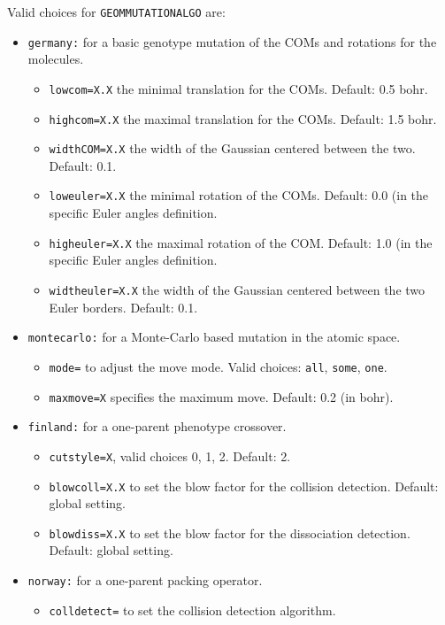 \documentclass[a4paper,10pt]{scrbook}
\begin{document}
Valid choices for \texttt{GEOMMUTATIONALGO} are:
\begin{itemize}
  \item \texttt{germany:} for a basic genotype mutation of the COMs and 
rotations for the molecules.
  \begin{itemize}
    \item \texttt{lowcom=X.X} the minimal translation for the COMs. Default: 
0.5 bohr.
    \item \texttt{highcom=X.X} the maximal translation for the COMs. Default: 
1.5 bohr.
    \item \texttt{widthCOM=X.X} the width of the Gaussian centered between the 
two. Default: 0.1.
    \item \texttt{loweuler=X.X} the minimal rotation of the COMs. Default: 0.0 
(in the specific Euler angles definition.
    \item \texttt{higheuler=X.X} the maximal rotation of the COM. Default: 1.0 
(in the specific Euler angles definition.
    \item \texttt{widtheuler=X.X} the width of the Gaussian centered between 
the two Euler borders. Default: 0.1.
  \end{itemize}
  \item \texttt{montecarlo:} for a Monte-Carlo based mutation in the atomic 
space.
  \begin{itemize}
    \item \texttt{mode=} to adjust the move mode. Valid choices: \texttt{all}, 
\texttt{some}, \texttt{one}.
    \item \texttt{maxmove=X} specifies the maximum move. Default: 0.2 (in bohr).
  \end{itemize}
  \item \texttt{finland:} for a one-parent phenotype crossover.
  \begin{itemize}
    \item \texttt{cutstyle=X}, valid choices 0, 1, 2. Default: 2.
    \item \texttt{blowcoll=X.X} to set the blow factor for the collision 
detection. Default: global setting.
    \item \texttt{blowdiss=X.X} to set the blow factor for the dissociation 
detection. Default: global setting.
  \end{itemize}
  \item \texttt{norway:} for a one-parent packing operator.
  \begin{itemize}
    \item \texttt{colldetect=} to set the collision detection algorithm. 

\end{itemize}
\end{itemize}
\end{document}
